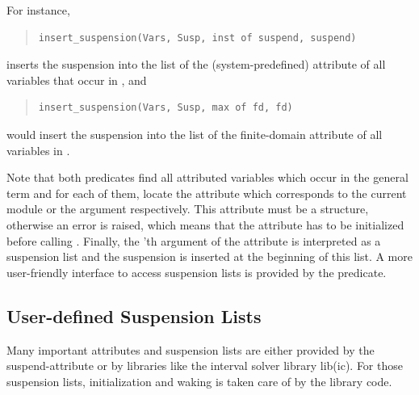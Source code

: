 {For instance,
\begin{quote}
\begin{verbatim}
insert_suspension(Vars, Susp, inst of suspend, suspend)
\end{verbatim}
\end{quote}
inserts the suspension into the 
list of the (system-predefined) 
attribute of all variables that occur in , and
\begin{quote}
\begin{verbatim}
insert_suspension(Vars, Susp, max of fd, fd)
\end{verbatim}
\end{quote}
would insert the suspension into the  list of the finite-domain
attribute of all variables in .

Note that both predicates
find all attributed variables which occur in the general term  and
for
each of them,
locate the attribute which corresponds to the current module or the
 argument respectively.
This attribute must be a structure, otherwise an error
is raised, which means that the attribute has to be initialized
before calling
.%
Finally, the 'th argument of the attribute
is interpreted as a suspension list and the suspension
 is inserted at the beginning of this list.
A more user-friendly interface to access suspension lists is
provided by the
predicate.


\subsection{User-defined Suspension Lists}

Many important attributes and suspension lists are either provided by
the suspend-attribute or by libraries like the interval solver library lib(ic).
For those suspension lists, initialization and waking is taken care of
by the library code.

}

